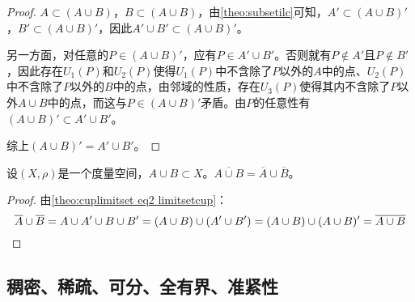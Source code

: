 \begin{proof}
	$A\subset (A\cup B)$，$B\subset (A\cup B)$，由\cref{theo:subsetilc}可知，$A'\subset(A\cup B)'$，$B'\subset(A\cup B)'$，因此$A'\cup B'\subset(A\cup B)'$。\par
	另一方面，对任意的$ P\in (A\cup B)'$，应有$P\in A'\cup B'$。否则就有$P\notin A'$且$P\notin B'$，因此存在$U_1(P)$和$U_2(P)$使得$U_1(P)$中不含除了$P$以外的$A$中的点、$U_2(P)$中不含除了$P$以外的$B$中的点，由邻域的性质，存在$U_3(P)$使得其内不含除了$P$以外$A\cup B$中的点，而这与$P\in (A\cup B)'$矛盾。由$P$的任意性有$(A\cup B)'\subset A'\cup B'$。\par
	综上$(A\cup B)'=A'\cup B'$。
\end{proof}
\begin{theorem}
	设$(X,\rho)$是一个度量空间，$A\cup B\subset X$。$\overline{A\cup B}=\overline{A}\cup \overline{B}$。
\end{theorem}
\begin{proof}
	由\cref{theo:cuplimitset eq2 limitsetcup}：
	\begin{equation*}
		\overline{A}\cup \overline{B}=A\cup A'\cup B\cup B'
		=(A\cup B)\cup(A'\cup B')=(A\cup B)\cup(A\cup B)'
		=\overline{A\cup B}\qedhere
	\end{equation*}
\end{proof}
\subsection{稠密、稀疏、可分、全有界、准紧性}
